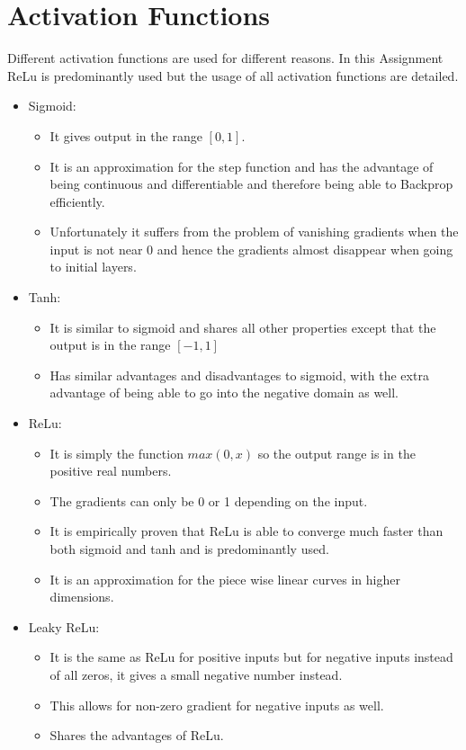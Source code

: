 \documentclass{article}
\begin{document}
\section{Activation Functions}
Different activation functions are used for different reasons. In this Assignment ReLu is predominantly used but the usage of all activation functions are detailed.
\begin{itemize}
\item Sigmoid:
  \begin{itemize}
  \item It gives output in the range $[0,1]$.
  \item It is an approximation for the step function and has the advantage of being continuous and differentiable and therefore being able to Backprop efficiently.
  \item Unfortunately it suffers from the problem of vanishing gradients when the input is not near 0 and hence the gradients almost disappear when going to initial layers.
  \end{itemize}
\item Tanh:
  \begin{itemize}
  \item It is similar to sigmoid and shares all other properties except that the output is in the range $[-1, 1]$
  \item Has similar advantages and disadvantages to sigmoid, with the extra advantage of being able to go into the negative domain as well.
  \end{itemize}
\item ReLu:
  \begin{itemize}
  \item It is simply the function $max(0, x)$ so the output range is in the positive real numbers.
  \item The gradients can only be 0 or 1 depending on the input.
  \item It is empirically proven that ReLu is able to converge much faster than both sigmoid and tanh and is predominantly used.
  \item It is an approximation for the piece wise linear curves in higher dimensions.
  \end{itemize}
\item Leaky ReLu:
  \begin{itemize}
  \item It is the same as ReLu for positive inputs but for negative inputs instead of all zeros, it gives a small negative number instead.
  \item This allows for non-zero gradient for negative inputs as well.
  \item Shares the advantages of ReLu.
  \end{itemize}
\end{itemize}
\end{document}
